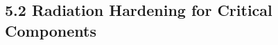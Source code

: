 \documentclass[fontsize=10pt, oneside, DIV=calc]{scrartcl}
\begin{document}
\begin{comment}
@startuml
!theme cloudscape-design
scale 1.6

skinparam defaultFontColor black
skinparam backgroundColor white


scale 1.6

'skinparam defaultFontColor black
'skinparam backgroundColor white

title ``Chip Deployment & Earth Dependency:\nInitial Supply Chain & Optimization''

skinparam rectangle {
  BorderColor black
  FontColor black
  shadowing 0
  FontSize 12
}
skinparam component {
  BorderColor black
  FontColor black
  shadowing 0
  FontSize 12
}
skinparam arrow {
  Color black
}

component ``Earth Mfg'' as EarthMfg
rectangle ``Packaging'' as Packaging
component ``Starship\nTransport'' as Transport
component ``Mars\nReceiving'' as MarsRx
rectangle ``Adaptation &\nHardening'' as Adapt
rectangle ``Quality\nControl'' as QC
rectangle ``Integration'' as Integrate
component ``Colossus AI\nData Center'' as Colossus

component ``AI Supply\nOptimization'' as AISupplyOpt
component ``Predictive\nFailure Analysis'' as PFAnalyze
component ``Modular\nDesign'' as ModDesign
component ``In-Situ\nRepair'' as InSituRepair


EarthMfg -down-> Packaging
Packaging -down-> Transport
Transport -down-> MarsRx
MarsRx -down-> Adapt
Adapt -down-> QC
QC -down-> Integrate
Integrate -down-> Colossus


AISupplyOpt --> Packaging
AISupplyOpt --> Transport
AISupplyOpt --> MarsRx

PFAnalyze --> Adapt
PFAnalyze --> QC
PFAnalyze --> Integrate
PFAnalyze --> InSituRepair

ModDesign --> Adapt
ModDesign --> Integrate
ModDesign --> InSituRepair

InSituRepair --> Colossus


note left of EarthMfg
  Earth
  Reliance
end note

note right of Transport
  Transport
  Factors
end note

note right of Adapt
  Martian
  Challenges
end note

note right of Colossus
  Colossus
  Scale
end note

@enduml
\end{comment}




\subsection*{5.2 Radiation Hardening for Critical Components}
\end{document}

